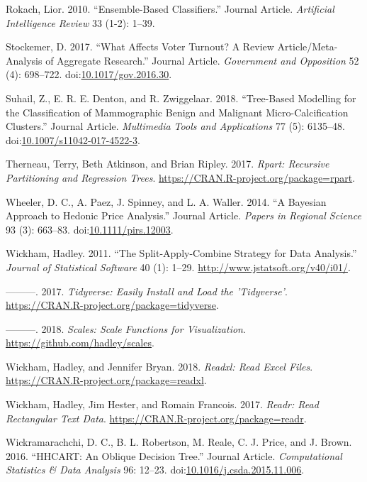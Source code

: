 \documentclass[]{elsarticle} %
\begin{document}
\hypertarget{ref-Rokach2010}{}
Rokach, Lior. 2010. ``Ensemble-Based Classifiers.'' Journal Article.
\emph{Artificial Intelligence Review} 33 (1-2): 1--39.

\hypertarget{ref-Stockemer2017}{}
Stockemer, D. 2017. ``What Affects Voter Turnout? A Review
Article/Meta-Analysis of Aggregate Research.'' Journal Article.
\emph{Government and Opposition} 52 (4): 698--722.
doi:\href{https://doi.org/10.1017/gov.2016.30}{10.1017/gov.2016.30}.

\hypertarget{ref-Suhail2018}{}
Suhail, Z., E. R. E. Denton, and R. Zwiggelaar. 2018. ``Tree-Based
Modelling for the Classification of Mammographic Benign and Malignant
Micro-Calcification Clusters.'' Journal Article. \emph{Multimedia Tools
and Applications} 77 (5): 6135--48.
doi:\href{https://doi.org/10.1007/s11042-017-4522-3}{10.1007/s11042-017-4522-3}.

\hypertarget{ref-Therneau2017}{}
Therneau, Terry, Beth Atkinson, and Brian Ripley. 2017. \emph{Rpart:
Recursive Partitioning and Regression Trees}.
\url{https://CRAN.R-project.org/package=rpart}.

\hypertarget{ref-Wheeler2014}{}
Wheeler, D. C., A. Paez, J. Spinney, and L. A. Waller. 2014. ``A
Bayesian Approach to Hedonic Price Analysis.'' Journal Article.
\emph{Papers in Regional Science} 93 (3): 663--83.
doi:\href{https://doi.org/10.1111/pirs.12003}{10.1111/pirs.12003}.

\hypertarget{ref-Wickham2011}{}
Wickham, Hadley. 2011. ``The Split-Apply-Combine Strategy for Data
Analysis.'' \emph{Journal of Statistical Software} 40 (1): 1--29.
\url{http://www.jstatsoft.org/v40/i01/}.

\hypertarget{ref-Wickham2017}{}
---------. 2017. \emph{Tidyverse: Easily Install and Load the
'Tidyverse'}. \url{https://CRAN.R-project.org/package=tidyverse}.

\hypertarget{ref-Wickham2018scales}{}
---------. 2018. \emph{Scales: Scale Functions for Visualization}.
\url{https://github.com/hadley/scales}.

\hypertarget{ref-Wickham2018}{}
Wickham, Hadley, and Jennifer Bryan. 2018. \emph{Readxl: Read Excel
Files}. \url{https://CRAN.R-project.org/package=readxl}.

\hypertarget{ref-Wickham2017readr}{}
Wickham, Hadley, Jim Hester, and Romain Francois. 2017. \emph{Readr:
Read Rectangular Text Data}.
\url{https://CRAN.R-project.org/package=readr}.

\hypertarget{ref-Wickramarachchi2016}{}
Wickramarachchi, D. C., B. L. Robertson, M. Reale, C. J. Price, and J.
Brown. 2016. ``HHCART: An Oblique Decision Tree.'' Journal Article.
\emph{Computational Statistics \& Data Analysis} 96: 12--23.
doi:\href{https://doi.org/10.1016/j.csda.2015.11.006}{10.1016/j.csda.2015.11.006}.
\end{document}
